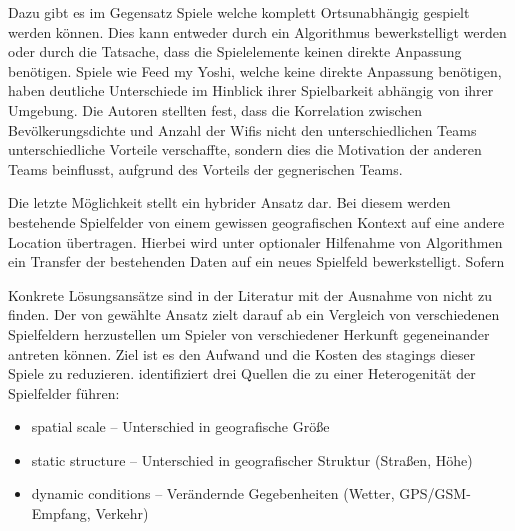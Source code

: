 Dazu gibt es im Gegensatz Spiele welche komplett Ortsunabhängig gespielt werden können.
Dies kann entweder durch ein Algorithmus bewerkstelligt werden oder durch die Tatsache, dass die Spielelemente keinen direkte Anpassung benötigen.
Spiele wie Feed my Yoshi, welche keine direkte Anpassung benötigen, haben deutliche Unterschiede im Hinblick ihrer Spielbarkeit abhängig von ihrer Umgebung. Die Autoren stellten fest, dass die Korrelation zwischen Bevölkerungsdichte und Anzahl der Wifis nicht den unterschiedlichen Teams unterschiedliche Vorteile verschaffte, sondern dies die Motivation der anderen Teams beinflusst, aufgrund des Vorteils der gegnerischen Teams.

Die letzte Möglichkeit stellt ein hybrider Ansatz dar. Bei diesem werden bestehende Spielfelder von einem gewissen geografischen Kontext auf eine andere Location übertragen. Hierbei wird unter optionaler Hilfenahme von Algorithmen ein Transfer der bestehenden Daten auf ein neues Spielfeld bewerkstelligt. Sofern

Konkrete Lösungsansätze sind in der Literatur mit der Ausnahme von \cite{Kiefer.2007}
nicht zu finden.
Der von \cite{Kiefer.2007} gewählte Ansatz zielt darauf ab ein Vergleich von verschiedenen Spielfeldern herzustellen um Spieler von verschiedener Herkunft gegeneinander antreten können. Ziel ist es den Aufwand und die Kosten des stagings dieser Spiele zu reduzieren. \citep{Kiefer.2007} identifiziert drei Quellen die zu einer Heterogenität der Spielfelder führen:

\begin{itemize}
\item spatial scale -- Unterschied in geografische Größe
\item static structure -- Unterschied in geografischer Struktur (Straßen, Höhe) 
\item dynamic conditions -- Verändernde Gegebenheiten (Wetter, GPS/GSM-Empfang, Verkehr)
\end{itemize}

